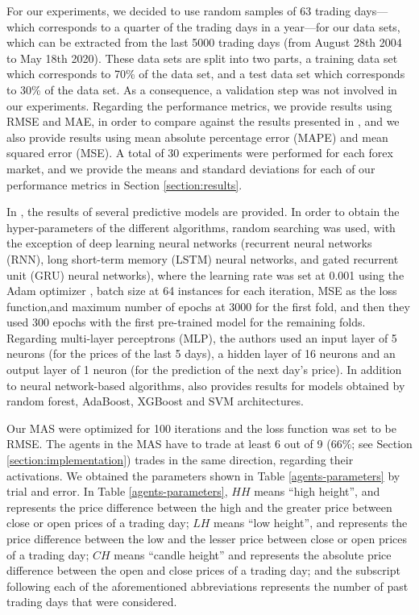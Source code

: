 ﻿\documentclass{ieeeaccess}
\begin{document}
For our experiments, we decided to use random samples of 63 trading
days---which corresponds to a quarter of the trading days in a
year---for our data sets, which can be extracted from the last 5000
trading days (from August 28th 2004 to May 18th 2020). %
These data sets
are split into two parts, a training data set which corresponds to
70\% of the data set, and a test data set which corresponds to 30\% of
the data set. As a consequence, a validation step was not involved in
our experiments. Regarding the performance metrics, we provide results
using RMSE and MAE, in order to compare against the results presented
in \cite{Munkhdalai2019}, and we also provide results using mean
absolute percentage error (MAPE) and mean squared error (MSE). A total
of 30 experiments were performed for each forex market, and we provide
the means and standard deviations for each of our performance metrics
in Section \ref{section:results}.

In \cite{Munkhdalai2019}, the results of several predictive models are
provided. In order to obtain the hyper-parameters of the different
algorithms, random searching was used, with the exception of deep
learning neural networks (recurrent neural networks (RNN), long
short-term memory (LSTM) neural networks, and gated recurrent unit
(GRU) neural networks), where the learning rate was set at 0.001 using
the Adam optimizer \cite{kingma2014adam}, batch size at 64 instances
for each iteration, MSE as the loss function,and maximum number of
epochs at 3000 for the first fold, and then they used 300 epochs with
the first pre-trained model for the remaining folds. Regarding
multi-layer perceptrons (MLP), the authors used an input layer of 5 neurons
(for the prices of the last 5 days), a hidden layer of 16 neurons and
an output layer of 1 neuron (for the prediction of the next day's
price). In addition to neural network-based algorithms,
\cite{kingma2014adam} also provides results for models obtained by
random forest, AdaBoost, XGBoost and SVM
architectures.

Our MAS were optimized for 100 iterations and the loss
function was set to be RMSE. The agents in the MAS
have to trade at least 6 out of 9 (66\%; see Section
\ref{section:implementation}) trades in the same direction, regarding
their activations. We obtained the parameters shown in Table
\ref{agents-parameters} by trial and error. In Table
\ref{agents-parameters}, $HH$ means ``high height'', and represents
the price difference between the high and the greater price between
close or open prices of a trading day; $LH$ means ``low height'', and
represents the price difference between the low and the lesser price
between close or open prices of a trading day; $CH$ means ``candle
height'' and represents the absolute price difference between the open
and close prices of a trading day; and the subscript following each of
the aforementioned abbreviations represents the number of past trading
days that were considered.
\end{document}
